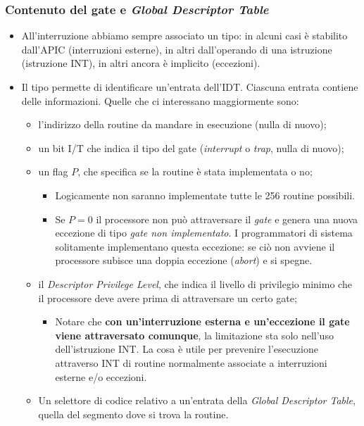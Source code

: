\documentclass[11pt]{report}
\theoremstyle{definition}
\begin{document}
\subsubsection{Contenuto del gate e \emph{Global Descriptor Table}}  	
\begin{itemize}
	\item All'interruzione abbiamo sempre associato un tipo: in alcuni casi è stabilito dall'APIC (interruzioni esterne), in altri dall'operando di una istruzione (istruzione INT), in altri ancora è implicito (eccezioni).
	\item Il tipo permette di identificare un'entrata dell'IDT. Ciascuna entrata contiene delle informazioni. Quelle che ci interessano maggiormente sono:
	\begin{itemize}
		\item l'indirizzo della routine da mandare in esecuzione (nulla di nuovo);
		\item un bit I/T che indica il tipo del gate (\textit{interrupt} o \textit{trap}, nulla di nuovo);
		\item un flag $P$, che specifica se la routine è stata implementata o no;
		\begin{itemize} 
			\item Logicamente non saranno implementate tutte le 256 routine possibili.
			\item Se $P=0$ il processore non può attraversare il \emph{gate} e genera una nuova eccezione di tipo \emph{gate non implementato}. I programmatori di sistema solitamente implementano questa eccezione: se ciò non avviene il processore subisce una doppia eccezione (\emph{abort}) e si spegne. 
		\end{itemize}
		\item il \emph{Descriptor Privilege Level}, che indica il livello di privilegio minimo  che il processore deve avere prima di attraversare un certo gate;
		\begin{itemize}
			\item Notare che \textbf{con un'interruzione esterna e un'eccezione il gate viene attraversato comunque}, la limitazione sta solo nell'uso dell'istruzione INT. La cosa è utile per prevenire l'esecuzione attraverso INT di routine normalmente associate a interruzioni esterne e/o eccezioni.
		\end{itemize} 
	\item Un selettore di codice relativo a un'entrata della \emph{Global Descriptor Table}, quella del segmento dove si trova la routine.
	\end{itemize}
\end{itemize} 
\end{document}
